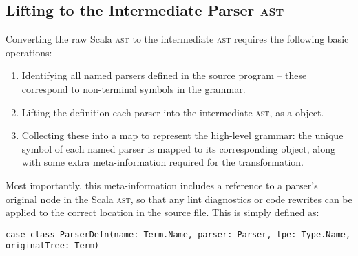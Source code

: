 \documentclass[../../main.tex]{subfiles}
\begin{document}

\subsection{Lifting to the Intermediate Parser \textsc{ast}}
Converting the raw Scala \textsc{ast} to the intermediate \textsc{ast} requires the following basic operations:
\begin{enumerate}
  \item Identifying all named parsers defined in the source program -- these correspond to non-terminal symbols in the grammar.
  \item Lifting the definition each parser into the intermediate \textsc{ast}, as a  object.
  \item Collecting these into a map to represent the high-level grammar: the unique symbol of each named parser is mapped to its corresponding  object, along with some extra meta-information required for the transformation.
\end{enumerate}
%
Most importantly, this meta-information includes a reference to a parser's original node in the Scala \textsc{ast}, so that any lint diagnostics or code rewrites can be applied to the correct location in the source file.
This is simply defined as:
\begin{verbatim}
case class ParserDefn(name: Term.Name, parser: Parser, tpe: Type.Name, originalTree: Term)
\end{verbatim}
\end{document}
